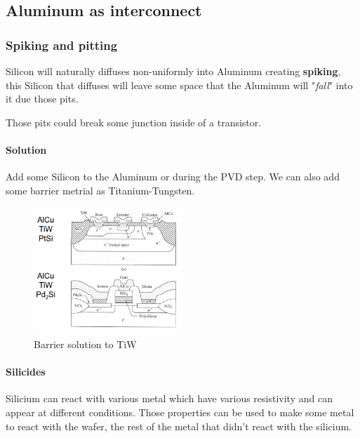 \documentclass[
]{article}
\begin{document}
\hypertarget{aluminum-as-interconnect}{%
\subsection{Aluminum as interconnect}\label{aluminum-as-interconnect}}

\hypertarget{spiking-and-pitting}{%
\subsubsection{Spiking and pitting}\label{spiking-and-pitting}}

Silicon will naturally diffuses non-uniformly into Aluminum creating
\textbf{spiking}, this Silicon that diffuses will leave some space that
the Aluminum will "\emph{fall}" into it due those pits.

Those pits could break some junction inside of a transistor.

\hypertarget{solution}{%
\paragraph{Solution}\label{solution}}

Add some Silicon to the Aluminum or during the PVD step. We can also add
some barrier metrial as Titanium-Tungsten.

\begin{figure}
\hypertarget{fig:TiW-label}{%
\centering
\includegraphics[width=0.5\textwidth,height=\textheight]{Solution_tiw.png}
\caption{Barrier solution to TiW}\label{fig:TiW-label}
}
\end{figure}

\hypertarget{silicides}{%
\paragraph{Silicides}\label{silicides}}

Silicium can react with various metal which have various resistivity and
can appear at different conditions. Those properties can be used to make
some metal to react with the wafer, the rest of the metal that didn't
react with the silicium.
\end{document}
